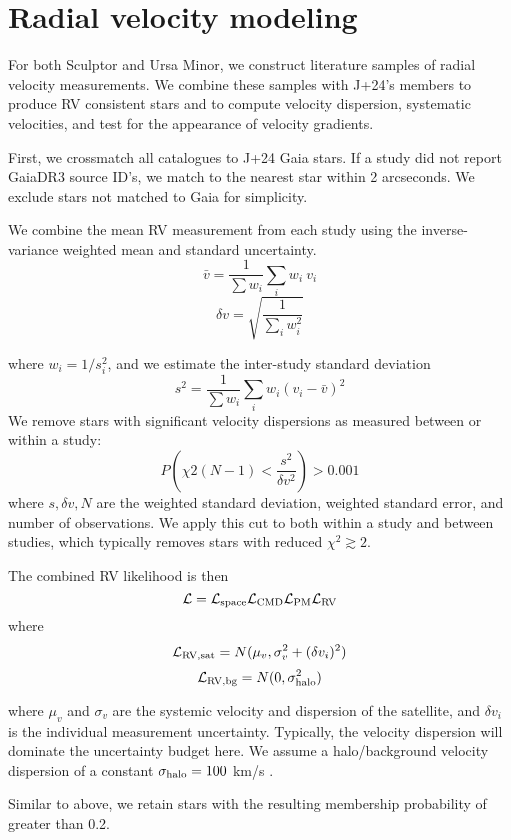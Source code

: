 \section{Radial velocity modeling}\label{radial-velocity-modeling}

For both Sculptor and Ursa Minor, we construct literature samples of
radial velocity measurements. We combine these samples with J+24's
members to produce RV consistent stars and to compute velocity
dispersion, systematic velocities, and test for the appearance of
velocity gradients.

First, we crossmatch all catalogues to J+24 Gaia stars. If a study did
not report GaiaDR3 source ID's, we match to the nearest star within 2
arcseconds. We exclude stars not matched to Gaia for simplicity.

We combine the mean RV measurement from each study using the
inverse-variance weighted mean and standard uncertainty. \[
\bar v = \frac{1}{\sum w_i}\sum_i w_i\ v_{i} 
\] \[
\delta v = \sqrt{\frac{1}{\sum_i w_{i}^2}}
\]

where \(w_i = 1/s_i^2\), and we estimate the inter-study standard
deviation \[
s^2 = \frac{1}{\sum w_i} \sum_i w_i (v_{i} - \bar v)^2
\] We remove stars with significant velocity dispersions as measured
between or within a study: \[
P\left(\chi2(N-1) < \frac{s^2}{\delta v^2}\right) > 0.001
\] where \(s, \delta v, N\) are the weighted standard deviation,
weighted standard error, and number of observations. We apply this cut
to both within a study and between studies, which typically removes
stars with reduced \(\chi^2 \gtrsim 2\).

The combined RV likelihood is then \[
{\cal L} = {\cal L}_{\rm space} {\cal L}_{\rm CMD} {\cal L}_{\rm PM} {\cal L}_{\rm RV}
\] where \[
{\cal L}_{\rm RV, sat} = N(\mu_{v}, \sigma_{v}^2 + (\delta v_i)^2)
\] \[
{\cal L}_{\rm RV, bg} = N(0, \sigma_{\rm halo}^2)
\]

where \(\mu_v\) and \(\sigma_v\) are the systemic velocity and
dispersion of the satellite, and \(\delta v_i\) is the individual
measurement uncertainty. Typically, the velocity dispersion will
dominate the uncertainty budget here. We assume a halo/background
velocity dispersion of a constant \(\sigma_{\rm halo} = 100\) km/s
\citep[e.g.][]{brown+2010}.

Similar to above, we retain stars with the resulting membership
probability of greater than 0.2.

